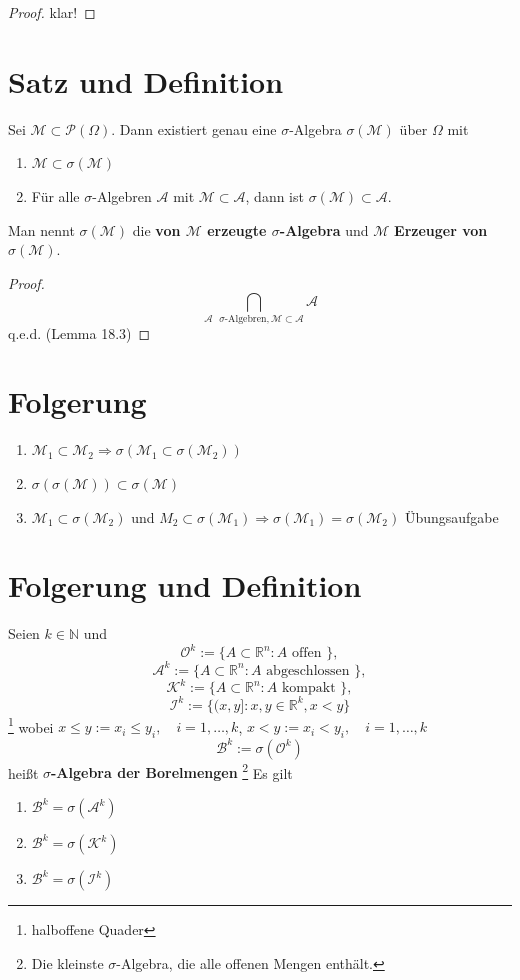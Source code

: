 \documentclass[a4paper,11pt,notitlepage]{report}
\newcommand{\R}{{\ensuremath{\mathbb{R}}}}
\newcommand{\N}{{\ensuremath{\mathbb{N}}}}
\begin{document}
\begin{proof}
	klar!
\end{proof}

\section{Satz und Definition}
Sei $\mathcal{M} \subset \mathcal{P}(\Omega)$. Dann existiert genau eine $\sigma$-Algebra $\sigma(\mathcal{M})$ über $\Omega$ mit
\begin{enumerate}
	\item $\mathcal{M} \subset \sigma(\mathcal{M})$
	\item Für alle $\sigma$-Algebren $\mathcal{A}$ mit $\mathcal{M} \subset \mathcal{A}$, dann ist $\sigma(\mathcal{M}) \subset \mathcal{A}$.
\end{enumerate}
Man nennt $\sigma(\mathcal{M})$ die \textbf{von $\mathcal{M}$ erzeugte $\sigma$-Algebra} und $\mathcal{M}$ \textbf{Erzeuger von $\sigma(\mathcal{M})$}.

\begin{proof}
	$$\bigcap\limits_{\mathcal{A} \text{ $\sigma$-Algebren}, \mathcal{M} \subset \mathcal{A}} \mathcal{A}$$
	q.e.d. (Lemma 18.3)
\end{proof}

\section{Folgerung}
\begin{enumerate}
	\item $\mathcal{M}_1 \subset \mathcal{M}_2 \Rightarrow \sigma(\mathcal{M}_1 \subset \sigma(\mathcal{M}_2))$
	\item $\sigma(\sigma(\mathcal{M})) \subset \sigma(\mathcal{M})$
	\item $\mathcal{M}_1 \subset \sigma(\mathcal{M}_2)$ und $M_2 \subset \sigma(\mathcal{M}_1) \Rightarrow \sigma(\mathcal{M}_1) = \sigma(\mathcal{M}_2)$ Übungsaufgabe
\end{enumerate}

\section{Folgerung und Definition}
Seien $k \in \N$ und
$$\mathcal{O}^k := \{ A \subset \R^n \colon A \text{ offen }\},$$
$$\mathcal{A}^k := \{ A \subset \R^n \colon A \text{ abgeschlossen }\},$$
$$\mathcal{K}^k := \{ A \subset \R^n \colon A \text{ kompakt }\},$$
$$\mathcal{I}^k := \{ (x,y] \colon x,y \in \R^k, x < y\}$$ \footnote{halboffene Quader}
wobei $x \leq y := x_i \leq y_i, \quad i = 1, \ldots, k$, \newline $x < y := x_i < y_i, \quad i = 1, \ldots, k$
$$\mathcal{B}^k := \sigma(\mathcal{O}^k)$$ heißt \textbf{$\sigma$-Algebra der Borelmengen} \footnote{Die kleinste $\sigma$-Algebra, die alle offenen Mengen enthält.}
Es gilt 
\begin{enumerate}
	\item $\mathcal{B}^k = \sigma(\mathcal{A}^k)$
	\item $\mathcal{B}^k = \sigma(\mathcal{K}^k)$
	\item $\mathcal{B}^k = \sigma(\mathcal{I}^k)$
\end{enumerate}
\end{document}
